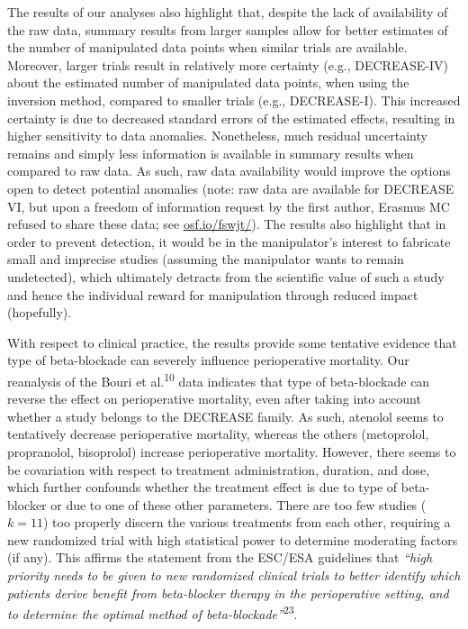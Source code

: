 \documentclass[]{article}
\begin{document}
The results of our analyses also highlight that, despite the lack of
availability of the raw data, summary results from larger samples allow
for better estimates of the number of manipulated data points when
similar trials are available. Moreover, larger trials result in
relatively more certainty (e.g., DECREASE-IV) about the estimated number
of manipulated data points, when using the inversion method, compared to
smaller trials (e.g., DECREASE-I). This increased certainty is due to
decreased standard errors of the estimated effects, resulting in higher
sensitivity to data anomalies. Nonetheless, much residual uncertainty
remains and simply less information is available in summary results when
compared to raw data. As such, raw data availability would improve the
options open to detect potential anomalies (note: raw data are available
for DECREASE VI, but upon a freedom of information request by the first
author, Erasmus MC refused to share these data; see
\href{https://osf.io/fswjt/}{osf.io/fswjt/}). The results also highlight
that in order to prevent detection, it would be in the manipulator's
interest to fabricate small and imprecise studies (assuming the
manipulator wants to remain undetected), which ultimately detracts from
the scientific value of such a study and hence the individual reward for
manipulation through reduced impact (hopefully).

With respect to clinical practice, the results provide some tentative
evidence that type of beta-blockade can severely influence perioperative
mortality. Our reanalysis of the Bouri et al.\textsuperscript{10} data
indicates that type of beta-blockade can reverse the effect on
perioperative mortality, even after taking into account whether a study
belongs to the DECREASE family. As such, atenolol seems to tentatively
decrease perioperative mortality, whereas the others (metoprolol,
propranolol, bisoprolol) increase perioperative mortality. However,
there seems to be covariation with respect to treatment administration,
duration, and dose, which further confounds whether the treatment effect
is due to type of beta-blocker or due to one of these other parameters.
There are too few studies (\(k=11\)) too properly discern the various
treatments from each other, requiring a new randomized trial with high
statistical power to determine moderating factors (if any). This affirms
the statement from the ESC/ESA guidelines that \emph{``high priority
needs to be given to new randomized clinical trials to better identify
which patients derive benefit from beta-blocker therapy in the
perioperative setting, and to determine the optimal method of
beta-blockade''}\textsuperscript{23}.
\end{document}
